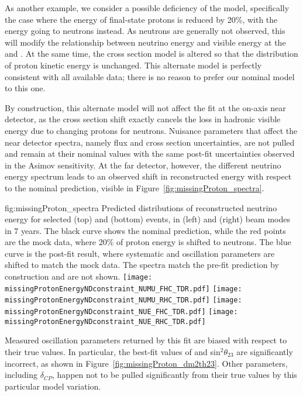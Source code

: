 As another example, we consider a possible deficiency of the  model, specifically the case where the energy of final-state protons is reduced by 20\%, with the energy going to neutrons instead. As neutrons are generally not observed, this will modify the relationship between neutrino energy and visible energy at the  and . At the same time, the cross section model is altered so that the distribution of proton kinetic energy is unchanged. This alternate model is perfectly consistent with all available data; there is no reason to prefer our nominal  model to this one.

By construction, this alternate model will not affect the fit at the on-axis near detector, as the cross section shift exactly cancels the loss in hadronic visible energy due to changing protons for neutrons. Nuisance parameters that affect the near detector spectra, namely flux and cross section uncertainties, are not pulled and remain at their nominal values with the same post-fit uncertainties observed in the Asimov sensitivity. At the far detector, however, the different neutrino energy spectrum leads to an observed shift in reconstructed energy with respect to the nominal prediction, visible in Figure~\ref{fig:missingProton_spectra}.

\begin{dunefigure}{fig:missingProton_spectra}
{Predicted distributions of reconstructed neutrino energy for selected \numu (top) and \nue (bottom) events, in  (left) and  (right) beam modes in 7 years. The black curve shows the nominal  prediction, while the red points are the mock data, where 20\% of proton energy is shifted to neutrons. The blue curve is the post-fit result, where systematic and oscillation parameters are shifted to match the mock data. The  spectra match the pre-fit prediction by construction and are not shown.}
  \texttt{[image: missingProtonEnergyNDconstraint\_NUMU\_FHC\_TDR.pdf]}
  \texttt{[image: missingProtonEnergyNDconstraint\_NUMU\_RHC\_TDR.pdf]}
  \texttt{[image: missingProtonEnergyNDconstraint\_NUE\_FHC\_TDR.pdf]}
  \texttt{[image: missingProtonEnergyNDconstraint\_NUE\_RHC\_TDR.pdf]}
\end{dunefigure}

Measured oscillation parameters returned by this fit are biased with respect to their true values. In particular, the best-fit values of  and sin$^{2}\theta_{23}$ are significantly incorrect, as shown in Figure~\ref{fig:missingProton_dm2th23}. Other parameters, including $\delta_{CP}$, happen not to be pulled significantly from their true values by this particular model variation.

